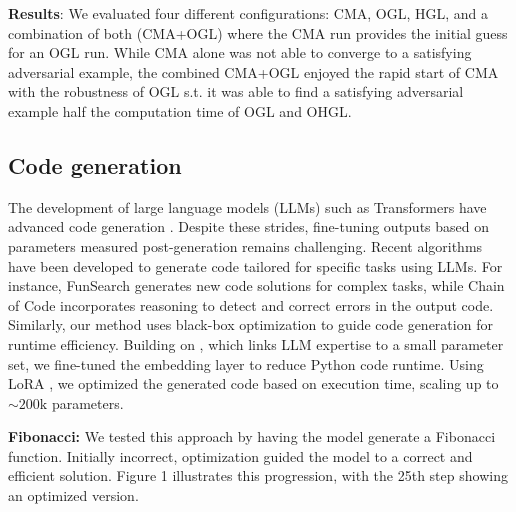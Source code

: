 \textbf{Results}: We evaluated four different configurations: CMA, OGL, HGL, and a combination of both (CMA+OGL) where the CMA run provides the initial guess for an OGL run. While CMA alone was not able to converge to a satisfying adversarial example, the combined CMA+OGL enjoyed the rapid start of CMA with the robustness of OGL s.t. it was able to find a satisfying adversarial example half the computation time of OGL and OHGL.


\subsection{Code generation}
The development of large language models (LLMs) such as Transformers \cite{vaswani2017attention} have advanced code generation \cite{dehaerne2022code}. Despite these strides, fine-tuning outputs based on parameters measured post-generation remains challenging.
Recent algorithms have been developed to generate code tailored for specific tasks using LLMs. For instance, FunSearch \cite{romera2024mathematical} generates new code solutions for complex tasks, while Chain of Code \cite{li2023chain} incorporates reasoning to detect and correct errors in the output code. Similarly, our method uses black-box optimization to guide code generation for runtime efficiency.
Building on \cite{zhang2024interpreting}, which links LLM expertise to a small parameter set, we fine-tuned the embedding layer to reduce Python code runtime. Using LoRA \cite{lora}, we optimized the generated code based on execution time, scaling up to $\sim 200\text{k}$ parameters.

\textbf{Fibonacci:}
We tested this approach by having the model generate a Fibonacci function. Initially incorrect, optimization guided the model to a correct and efficient solution. Figure 1 illustrates this progression, with the 25th step showing an optimized version.

